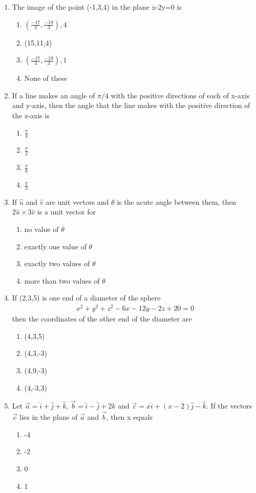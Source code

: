 \begin{enumerate}[label=\arabic*.,ref=\thesubsection.\theenumi]
\item The image of the point (-1,3,4) in the plane x-2y=0 is
\begin{enumerate}
\item $(\frac{-17}{3}, \frac{-19}{3}), 4$
\item (15,11,4)
\item $(\frac{-17}{3}, \frac{-19}{3}), 1$
\item None of these
\end{enumerate}

\item If a line makes an angle of $\pi/4$ with the positive directions of each of x-axis and y-axis, then the angle that the line makes with the positive direction of the z-axis is
\begin{enumerate}
\item $\frac{\pi}{4}$
\item $\frac{\pi}{2}$
\item $\frac{\pi}{6}$
\item $\frac{\pi}{3}$
\end{enumerate}

\item If $\hat{u}$ and $\hat{v}$ are unit vectors and $\theta$ is the acute angle between them, then $2\hat{u} \times 3\hat{v}$ is a unit vector for
\begin{enumerate}
\item no value of $\theta$
\item exactly one value of $\theta$
\item exactly two values of $\theta$
\item more than two values of $\theta$
\end{enumerate}

\item If (2,3,5) is one end of a diameter of the sphere
\begin{align}
x^2+y^2+z^2-6x-12y-2z+20=0
\end{align}
then the coordinates of the other end of the diameter are
\begin{enumerate}
\item (4,3,5)
\item (4,3,-3)
\item (4,9,-3)
\item (4,-3,3)
\end{enumerate}

\item Let $\overrightarrow{a}=\hat{i}+\hat{j}+\hat{k}$, $\overrightarrow{b}=\hat{i}-\hat{j}+2\hat{k}$ and $\overrightarrow{c}=x\hat{i}+(x-2)\hat{j}-\hat{k}$. If the vectors $\overrightarrow{c}$ lies in the plane of $\overrightarrow{a}$ and $\overrightarrow{b}$, then x equals
\begin{enumerate}
\item -4
\item -2
\item 0
\item 1
\end{enumerate}


\end{enumerate}
